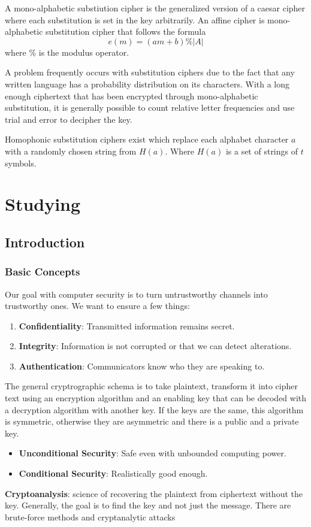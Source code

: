 \documentclass[11pt]{article}
\begin{document}
A mono-alphabetic substiution cipher is the generalized version of a caesar cipher where each substitution is set in the key arbitrarily.
An affine cipher is  mono-alphabetic substitution cipher that follows the formula 
\begin{equation}
    e(m) = (am + b) \% |A|
\end{equation}
where \% is the modulus operator.

A problem frequently occurs with substitution ciphers due to the fact that any written language has a probability distribution on its characters.
With a long enough ciphertext that has been encrypted through mono-alphabetic substitution, it is generally possible to count relative letter frequencies and use trial and error to decipher the key.


Homophonic substitution ciphers exist which replace each alphabet character $a$ with a randomly chosen string from $H(a)$.
Where $H(a)$ is a set of strings of $t$ symbols.

\section{Studying}
\subsection{Introduction}
\subsubsection{Basic Concepts}
Our goal with computer security is to turn untrustworthy channels into trustworthy ones.
We want to ensure a few things:
\begin{enumerate}
    \item \textbf{Confidentiality}: Transmitted information remains secret.
    \item \textbf{Integrity}: Information is not corrupted or that we can detect alterations.
    \item \textbf{Authentication}: Communicators know who they are speaking to.
\end{enumerate}
The general cryptrographic schema is to take plaintext, transform it into cipher text using an encryption algorithm and an enabling key that can be decoded with a decryption algorithm with another key.
If the keys are the same, this algorithm is symmetric, otherwise they are asymmetric and there is a public and a private key.

\begin{itemize}
    \item \textbf{Unconditional Security}: Safe even with unbounded computing power.
    \item \textbf{Conditional Security}: Realistically good enough.
\end{itemize}
\textbf{Cryptoanalysis}: science of recovering the plaintext from ciphertext without the key.
Generally, the goal is to find the key and not just the message.
There are brute-force methods and cryptanalytic attacks
\end{document}
